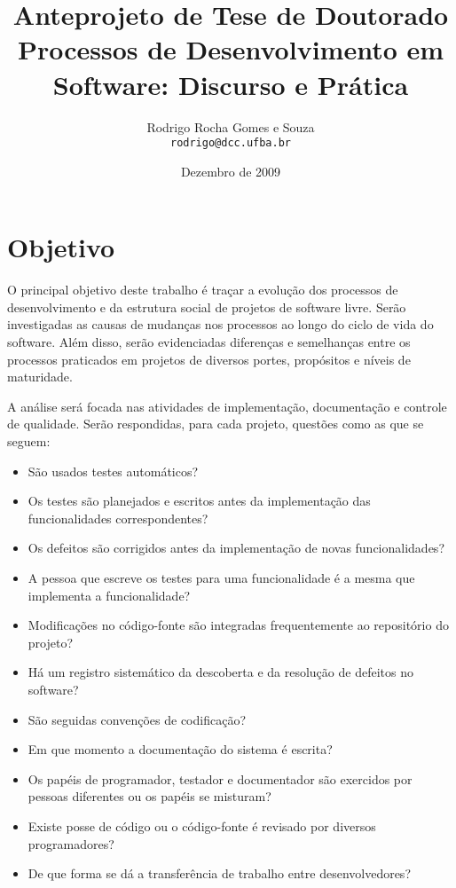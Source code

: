 \documentclass{article}
\title{
{\small Anteprojeto de Tese de Doutorado}
\\
Processos de Desenvolvimento em \\
Software: Discurso e Prática
%
}
\author{Rodrigo Rocha Gomes e Souza\\
\texttt{rodrigo@dcc.ufba.br}
}
\date{Dezembro de 2009}
\begin{document}
\sloppy
\maketitle





\section{Objetivo}

O principal objetivo deste trabalho é traçar a evolução dos processos de
desenvolvimento e da estrutura social de projetos de software livre. Serão
investigadas as causas de mudanças nos processos ao longo do ciclo de vida do
software. Além disso, serão evidenciadas diferenças e semelhanças entre os
processos praticados em projetos de diversos portes, propósitos e níveis de
maturidade.

A análise será focada nas atividades de implementação, documentação e controle
de qualidade. Serão respondidas, para cada projeto, questões como as que se
seguem:

\begin{itemize}
  \item São usados testes automáticos?
  \item Os testes são planejados e escritos antes da implementação das funcionalidades correspondentes?
  \item Os defeitos são corrigidos antes da implementação de novas funcionalidades?
  \item A pessoa que escreve os testes para uma funcionalidade é a mesma que implementa a funcionalidade?
  \item Modificações no código-fonte são integradas frequentemente ao repositório do projeto?
  \item Há um registro sistemático da descoberta e da resolução de defeitos no software?
  \item São seguidas convenções de codificação?
  \item Em que momento a documentação do sistema é escrita?
  \item Os papéis de programador, testador e documentador são exercidos por pessoas diferentes ou os papéis se misturam?
  \item Existe posse de código ou o código-fonte é revisado por diversos programadores?
  \item De que forma se dá a transferência de trabalho entre desenvolvedores?
\end{itemize}
\end{document}
